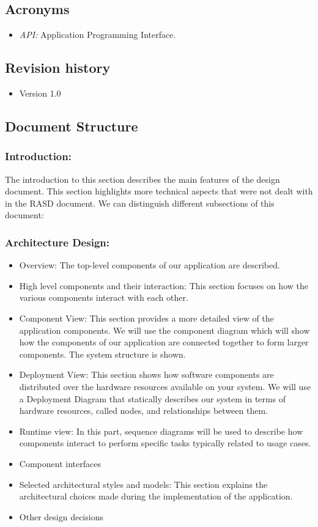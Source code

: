 \documentclass [12pt]{article}
\begin{document}
\subsection{Acronyms}
\begin{itemize}
\item\textit{API:} Application Programming Interface.
\end{itemize}

\subsection{Revision history}
\begin{itemize}
\item Version 1.0
\end{itemize}

\subsection{Document Structure}


\subsubsection{Introduction:}
The introduction to this section describes the main features of the design document. This section highlights more technical aspects that were not dealt with in the RASD document. We can distinguish different subsections of this document:
\subsubsection{Architecture Design:}
\begin{itemize}
\item Overview: The top-level components of our application are described.
\item High level components and their interaction: This section focuses on how the various components interact with each other.
\item Component View: This section provides a more detailed view of the application components. We will use the component diagram which will show how the components of our application are connected together to form larger components. The system structure is shown.
\item Deployment View: This section shows how software components are distributed over the hardware resources available on your system. We will use a Deployment Diagram that statically describes our system in terms of hardware resources, called nodes, and relationships between them.  
\item Runtime view: In this part, sequence diagrams will be used to describe how components interact to perform specific tasks typically related to usage cases.
\item Component interfaces
\item Selected architectural styles and models: This section explains the architectural choices made during the implementation of the application.
\item Other design decisions
\end{itemize}
\end{document}
